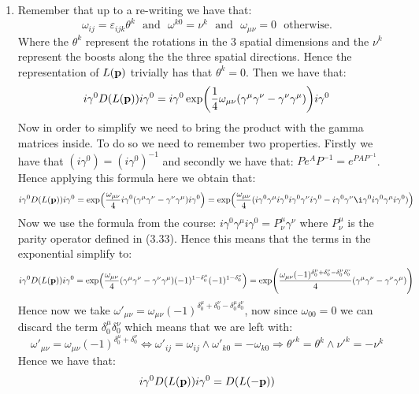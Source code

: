 \documentclass[10pt,a4paper]{article}
\begin{document}
\begin{enumerate}

\item Remember that up to a re-writing we have that:
\[
\omega_{ij} = \varepsilon_{i j k} \theta^k \mbox{~~and~~} \omega^{k0} = \nu^k \mbox{~~and~~} \omega_{\mu \nu} = 0 \mbox{~~otherwise.}
\]
Where the $\theta^k$ represent the rotations in the 3 spatial dimensions and the $\nu^k$ represent the boosts along the the three spatial directions. Hence the representation of $L(\vb{p})$ trivially has that $\theta^k = 0$. Then we have that:
\[
i \gamma^0 D(L(\vb{p})) i \gamma^0 = i \gamma^0 \exp( \frac{1}{4} \omega_{\mu \nu} (\gamma^\mu \gamma^\nu - \gamma^\nu \gamma^\mu) ) i \gamma^0
\] 
Now in order to simplify we need to bring the product with the gamma matrices inside. To do so we need to remember two properties. Firstly we have that $(i\gamma^0) = (i\gamma^0)^{-1}$ and secondly we have that: $P e^A P^{-1} = e^{P A P^{-1}}$. Hence applying this formula here we obtain that:
\[
i\gamma^0 D(L(\vb{p})) i \gamma^0 = \exp(\frac{\omega_{\mu \nu}}{4} i\gamma^0 (\gamma^\mu \gamma^\nu - \gamma^\nu \gamma^\mu) i\gamma^0   ) = \exp(\frac{\omega_{\mu \nu}}{4} (i \gamma^0 \gamma^\mu i \gamma^0 i \gamma^0 \gamma^\nu i \gamma^0 - i\gamma^0\gamma^\nu \i \gamma^ 0 i \gamma^0 \gamma^\mu i\gamma^0)   )
\] 
Now we use the formula from the course: $i\gamma^0 \gamma^\mu i \gamma^0 = P^\mu_\nu \gamma^\nu$ where $P^\mu_\nu$ is the parity operator defined in (3.33). Hence this means that the terms in the exponential simplify to:
\[
i\gamma^0 D(L(\vb{p})) i \gamma^0 = \exp(\frac{\omega_{\mu \nu}}{4}  (\gamma^\mu \gamma^\nu - \gamma^\nu \gamma^\mu) (-1)^{1 - \delta^\mu_0}  (-1)^{1 - \delta^\nu_0}) = \exp(\frac{\omega_{\mu \nu}(-1)^{\delta^\mu_0 + \delta^\nu_0 - \delta^\mu_0 \delta^\nu_0} }{4}  (\gamma^\mu \gamma^\nu - \gamma^\nu \gamma^\mu)) 
\]
Hence now we take $\omega'_{\mu \nu} = \omega_{\mu \nu}(-1)^{\delta^\mu_0 + \delta^\nu_0 - \delta^\mu_0 \delta^\nu_0}$, now since $\omega_{00} = 0$ we can discard the term $\delta^\mu_0 \delta^\nu_0$ which means that we are left with:
\[
\omega'_{\mu \nu } = \omega_{\mu \nu}(-1)^{\delta^\mu_0 + \delta^\nu_0} \Leftrightarrow \omega'_{ij} = \omega_{ij} \land \omega'_{k 0} = - \omega_{k 0} \Rightarrow \theta'^k = \theta^k \land \nu'^k = -\nu^k
\]
Hence we have that:
\[
i\gamma^0 D(L(\vb{p})) i \gamma^0 = D(L(-\vb{p}))
\]


\end{enumerate}
\end{document}

